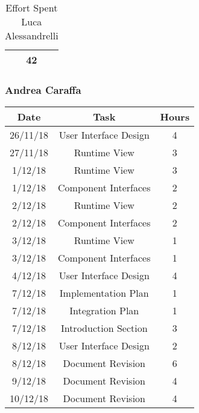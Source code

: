 \begin{table}[h]
\begin{tabular}{|c|c|c|}
\rowcolor[HTML]{FE996B} 
\multicolumn{2}{|c|}{\cellcolor[HTML]{FE996B}Total} & \cellcolor[HTML]{FFFC9E}42 \\ \hline
\end{tabular}
\caption{Effort Spent Luca Alessandrelli}
\end{table}

\clearpage
\newpage

\subsubsection{Andrea Caraffa}
\begin{table}[h]
\centering
\begin{tabular}{|c|c|c|}
\hline
\rowcolor[HTML]{FE996B} 
Date & Task & Hours 
\\ \hline
\rowcolor[HTML]{FFFC9E} 
26/11/18  & User Interface Design & 4
\\ \hline
\rowcolor[HTML]{FFFC9E} 
27/11/18 & Runtime View & 3 
\\ \hline
\rowcolor[HTML]{FFFC9E}
1/12/18 & Runtime View & 3
\\ \hline
\rowcolor[HTML]{FFFC9E}
1/12/18 & Component Interfaces & 2
\\ \hline
\rowcolor[HTML]{FFFC9E}
2/12/18 & Runtime View & 2
\\ \hline
\rowcolor[HTML]{FFFC9E}
2/12/18 & Component Interfaces & 2
\\ \hline
\rowcolor[HTML]{FFFC9E}
3/12/18 & Runtime View & 1
\\ \hline
\rowcolor[HTML]{FFFC9E}
3/12/18 & Component Interfaces & 1
\\ \hline
\rowcolor[HTML]{FFFC9E}
4/12/18 & User Interface Design & 4
\\ \hline
\rowcolor[HTML]{FFFC9E}
7/12/18 & Implementation Plan & 1
\\ \hline
\rowcolor[HTML]{FFFC9E}
7/12/18 & Integration Plan & 1
\\ \hline
\rowcolor[HTML]{FFFC9E}
7/12/18 & Introduction Section & 3
\\ \hline
\rowcolor[HTML]{FFFC9E}
8/12/18 & User Interface Design & 2
\\ \hline
\rowcolor[HTML]{FFFC9E}
8/12/18 & Document Revision & 6
\\ \hline
\rowcolor[HTML]{FFFC9E}
9/12/18 & Document Revision & 4
\\ \hline
\rowcolor[HTML]{FFFC9E}
10/12/18 & Document Revision & 4
\\ \hline



\end{tabular}
\end{table}
